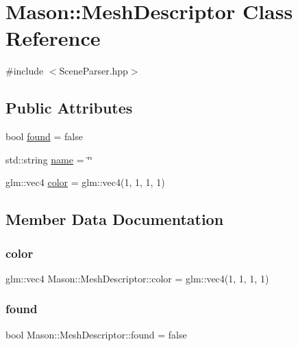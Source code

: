 \hypertarget{class_mason_1_1_mesh_descriptor}{}\section{Mason\+:\+:Mesh\+Descriptor Class Reference}
\label{class_mason_1_1_mesh_descriptor}


{\ttfamily \#include $<$Scene\+Parser.\+hpp$>$}

\subsection*{Public Attributes}
\begin{DoxyCompactItemize}
\item 
bool \hyperlink{class_mason_1_1_mesh_descriptor_a4757e26b1f365cc87b6b0e5fa82f6ac8}{found} = false
\item 
std\+::string \hyperlink{class_mason_1_1_mesh_descriptor_a75515c41cf63390da23028110fb450dd}{name} = \char`\"{}\char`\"{}
\item 
glm\+::vec4 \hyperlink{class_mason_1_1_mesh_descriptor_a1da5d438d63dfb65504de269e88dc379}{color} = glm\+::vec4(1, 1, 1, 1)
\end{DoxyCompactItemize}


\subsection{Member Data Documentation}
\hypertarget{class_mason_1_1_mesh_descriptor_a1da5d438d63dfb65504de269e88dc379}{}\label{class_mason_1_1_mesh_descriptor_a1da5d438d63dfb65504de269e88dc379} 
\subsubsection{\texorpdfstring{color}{color}}
{\footnotesize\ttfamily glm\+::vec4 Mason\+::\+Mesh\+Descriptor\+::color = glm\+::vec4(1, 1, 1, 1)}

\hypertarget{class_mason_1_1_mesh_descriptor_a4757e26b1f365cc87b6b0e5fa82f6ac8}{}\label{class_mason_1_1_mesh_descriptor_a4757e26b1f365cc87b6b0e5fa82f6ac8} 
\subsubsection{\texorpdfstring{found}{found}}
{\footnotesize\ttfamily bool Mason\+::\+Mesh\+Descriptor\+::found = false}

